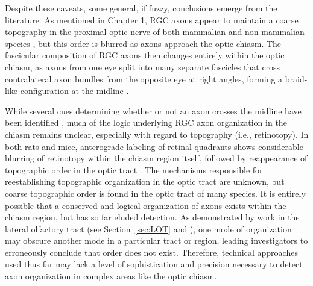 Despite these caveats, some general, if fuzzy, conclusions emerge from the literature.
As mentioned in Chapter 1, RGC axons appear to maintain a coarse topography in the proximal optic nerve of both mammalian \cite{chan1999changes,plas2005pretarget,chan1994changes,simon1991relationship,reese1993reestablishment,horton1979non,naito1986course,naito1994retinogeniculate} and non-mammalian species \cite{montgomery1998organization,ehrlich1984course}, but this order is blurred as axons approach the optic chiasm.
The fascicular composition of RGC axons then changes entirely within the optic chiasm, as axons from one eye split into many separate fascicles that cross contralateral axon bundles from the opposite eye at right angles, forming a braid-like configuration at the midline \cite{colello1998changing}.

While several cues determining whether or not an axon crosses the midline have been identified \cite{erskine2014connecting}, much of the logic underlying RGC axon organization in the chiasm remains unclear, especially with regard to topography (i.e., retinotopy).
In both rats and mice, anterograde labeling of retinal quadrants shows considerable blurring of retinotopy within the chiasm region itself, followed by reappearance of topographic order in the optic tract \cite{chan1994changes,chan1999changes}.
The mechanisms responsible for reestablishing topographic organization in the optic tract are unknown, but coarse topographic order is found in the optic tract of many species.
It is entirely possible that a conserved and logical organization of axons exists within the chiasm region, but has so far eluded detection.
As demonstrated by work in the lateral olfactory tract (see Section~\ref{sec:LOT} and ), one mode of organization may obscure another mode in a particular tract or region, leading investigators to erroneously conclude that order does not exist.
Therefore, technical approaches used thus far may lack a level of sophistication and precision necessary to detect axon organization in complex areas like the optic chiasm.

